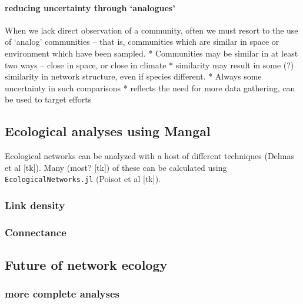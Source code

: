 \hypertarget{reducing-uncertainty-through-analogues}{%
\paragraph{reducing uncertainty through
`analogues'}\label{reducing-uncertainty-through-analogues}}

When we lack direct observation of a community, often we must resort to
the use of `analog' communities -- that is, communities which are
similar in space or environment which have been sampled. * Communities
may be similar in at least two ways -- close in space, or close in
climate * similarity may result in some (?) similarity in network
structure, even if species different. * Always some uncertainty in such
comparisons * reflects the need for more data gathering, can be used to
target efforts

\hypertarget{ecological-analyses-using-mangal}{%
\subsection{Ecological analyses using
Mangal}\label{ecological-analyses-using-mangal}}

Ecological networks can be analyzed with a host of different techniques
(Delmas et al {[}tk{]}). Many (most? {[}tk{]}) of these can be
calculated using \texttt{EcologicalNetworks.jl} (Poisot et al {[}tk{]}).

\hypertarget{link-density}{%
\subsubsection{Link density}\label{link-density}}

\hypertarget{connectance}{%
\subsubsection{Connectance}\label{connectance}}

\hypertarget{future-of-network-ecology}{%
\subsection{Future of network ecology}\label{future-of-network-ecology}}

\hypertarget{more-complete-analyses}{%
\subsubsection{more complete analyses}\label{more-complete-analyses}}

